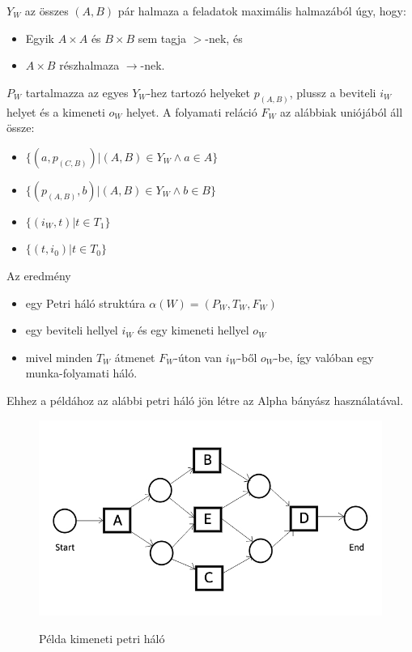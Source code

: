 \newpage

\noindent $Y_W$ az összes $(A,B)$  pár halmaza a feladatok maximális halmazából úgy, hogy:
\begin{itemize}
	\item {Egyik $A \times A$ és $B \times B$ sem tagja $>$-nek, és}
	\item {$A \times B$ részhalmaza $\rightarrow$-nek.}
\end{itemize}
\noindent $P_W$ tartalmazza az egyes $Y_W$-hez tartozó helyeket $p_{(A,B)}$, plussz a beviteli $i_W$ helyet és a kimeneti $o_W$ helyet.
\noindent A folyamati reláció $F_W$ az alábbiak uniójából áll össze:
\begin{itemize}
\item $\{(a,p_{(C,B)})|(A,B) \in Y_W \wedge a \in A\}$
\item $\{(p_{(A,B)},b)|(A,B) \in Y_W \wedge b \in B\}$
\item $\{(i_W,t)|t \in T_1\}$
\item $\{(t,i_0)|t \in T_0\}$
\end{itemize}

\noindent Az eredmény

\begin{itemize}
\item egy Petri háló struktúra $\alpha (W) = (P_W, T_W, F_W)$
\item egy beviteli hellyel $i_W$ és egy kimeneti hellyel $o_W$
\item mivel minden $T_W$ átmenet $F_W$-úton van $i_W$-ből $o_W$-be, így valóban egy munka\hyp{}folyamati háló.
\end{itemize}

\noindent Ehhez a példához az alábbi petri háló jön létre az Alpha bányász használatával.
\begin{figure}[h]
\caption{Példa kimeneti petri háló}
\begin{center}
\includegraphics[width=\textwidth,height=\textheight,keepaspectratio]{images/img_alpha_petri_output}\\
\label{fig:example}
\end{center}
\end{figure}

